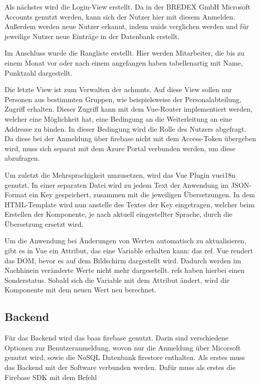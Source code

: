 \documentclass[11pt]{article}
\begin{document}
Als nächstes wird die Login-View erstellt. Da in der BREDEX GmbH Microsoft Accounts
genutzt werden, kann sich der Nutzer hier mit diesem Anmelden. Außerdem werden neue Nutzer
erkannt, indem \glspl{uuid} verglichen werden und für jeweilige Nutzer neue Einträge in der
Datenbank erstellt.

Im Anschluss wurde die Rangliste erstellt. Hier werden Mitarbeiter, die bis zu einem Monat vor oder
nach einem angefangen haben tabellenartig mit Name, Punktzahl dargestellt. %

Die letzte View ist zum Verwalten der \glspl{achmnt}. Auf diese View sollen nur Personen
aus bestimmten Gruppen, wie beispielsweise der Personalabteilung, Zugriff erhalten. Dieser Zugriff
kann mit dem Vue-Router implementiert werden, welcher eine Möglichkeit hat, eine Bedingung
an die Weiterleitung an eine Addresse zu binden. In dieser Bedingung wird die Rolle des
Nutzers abgefragt. Da diese bei der Anmeldung über \gls{firebase} nicht mit dem Access-Token
übergeben wird, muss sich separat mit dem Azure Portal verbunden werden, um diese abzufragen.

Um zuletzt die Mehrsprachigkeit umzusetzen, wird das Vue Plugin \gls{vuei18n} genutzt.
In einer separaten Datei wird zu jedem Text der Anwendung im JSON-Format ein Key gespeichert, zusammen mit
die jeweiligen Übersetzungen. In dem HTML-Template wird nun anstelle des Textes der Key eingetragen,
welcher beim Erstellen der Komponente, je nach aktuell eingestellter Sprache, durch die Übersetzung
ersetzt wird.

Um die Anwendung bei Änderungen von Werten automatisch zu aktualisieren, gibt es in Vue ein Attribut, das eine
Variable erhalten kann: das \Gls{ref}. Vue rendert das DOM, bevor es auf dem Bildschirm dargestellt wird.
Dadurch werden im Nachhinein veränderte Werte nicht mehr dargesetellt. \Glspl{ref} haben hierbei einen Sonderstatus.
Sobald sich die Variable mit dem Attribut ändert, wird die Komponente mit dem neuen Wert neu berechnet.



\subsection{Backend}

Für das Backend wird das \gls{baas} \gls{firebase} genutzt. Darin sind verschiedene Optionen zur Benutzeranmeldung, 
wovon nur die Anmeldung über Micorsoft genutzt wird, sowie die NoSQL Datenbank \gls{firestore} enthalten. 
Als erstes muss das Backend mit der Software verbunden werden. Dafür muss als erstes die Firebase SDK mit dem Befehl
\end{document}

